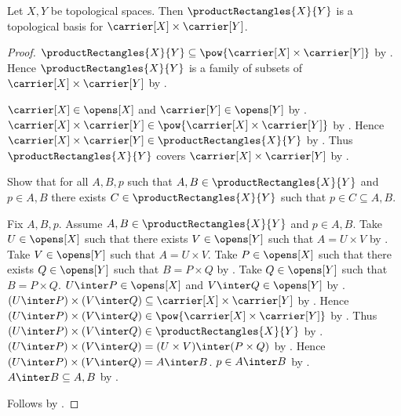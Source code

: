 \begin{proposition}\label{product_rectangles_are_topological_basis}
    Let $X,Y$ be topological spaces.
    Then $\productRectangles{X}{Y}$ is a topological basis for
        $\carrier[X]\times\carrier[Y]$.
\end{proposition}
\begin{proof}
    $\productRectangles{X}{Y}\subseteq
        \pow{\carrier[X]\times\carrier[Y]}$ by
        .
    Hence $\productRectangles{X}{Y}$ is a family of subsets of
        $\carrier[X]\times\carrier[Y]$ by
        .

    $\carrier[X]\in\opens[X]$ and $\carrier[Y]\in\opens[Y]$ by
        .
    $\carrier[X]\times\carrier[Y]
        \in\pow{\carrier[X]\times\carrier[Y]}$ by
        .
    Hence $\carrier[X]\times\carrier[Y]
        \in\productRectangles{X}{Y}$ by
        .
    Thus $\productRectangles{X}{Y}$ covers
        $\carrier[X]\times\carrier[Y]$ by
        .

    Show that for all $A,B,p$ such that
        $A,B\in\productRectangles{X}{Y}$ and $p\in A,B$
        there exists $C\in\productRectangles{X}{Y}$ such that
            $p\in C\subseteq A,B$.
    \begin{subproof}
        Fix $A,B,p$.
        Assume $A,B\in\productRectangles{X}{Y}$ and $p\in A,B$.
        Take $U\in\opens[X]$ such that there exists $V\in\opens[Y]$
            such that $A=U\times V$ by .
        Take $V\in\opens[Y]$ such that $A=U\times V$.
        Take $P\in\opens[X]$ such that there exists $Q\in\opens[Y]$
            such that $B=P\times Q$ by .
        Take $Q\in\opens[Y]$ such that $B=P\times Q$.
        $U\inter P\in\opens[X]$ and $V\inter Q\in\opens[Y]$ by
            .
        $(U\inter P)\times(V\inter Q)
            \subseteq\carrier[X]\times\carrier[Y]$ by
            .
        Hence $(U\inter P)\times(V\inter Q)
            \in\pow{\carrier[X]\times\carrier[Y]}$ by
            .
        Thus $(U\inter P)\times(V\inter Q)
            \in\productRectangles{X}{Y}$ by
            .
        $(U\inter P)\times(V\inter Q)
            =(U\times V)\inter(P\times Q)$ by .
        Hence $(U\inter P)\times(V\inter Q)=A\inter B$.
        $p\in A\inter B$ by .
        $A\inter B\subseteq A,B$ by .
    \end{subproof}
    Follows by .
\end{proof}


